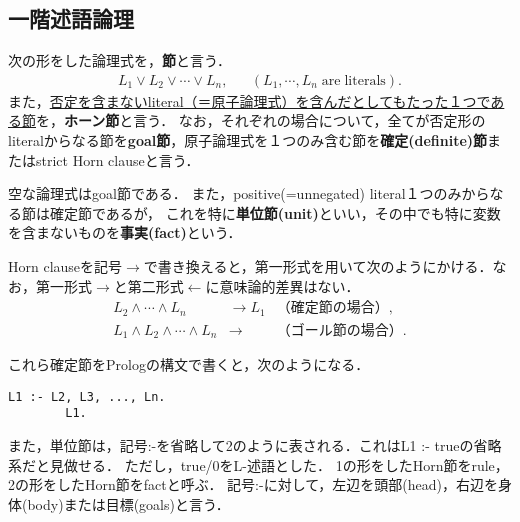\documentclass[uplatex, 12pt, dvipdfmx]{jsreport}
\begin{document}
\begin{example}
    
\end{example}

\subsection{一階述語論理}

\begin{definition}
    次の形をした論理式を，\textbf{節}と言う．
    \begin{align*}
        L_1\lor L_2\lor\cdots\lor L_n, && (L_1,\cdots,L_n\mathrm{\;are\;literals}).
    \end{align*}
    また，\underline{否定を含まないliteral（＝原子論理式）を含んだとしてもたった１つである節}を，\textbf{ホーン節}と言う．
    なお，それぞれの場合について，全てが否定形のliteralからなる節を\textbf{goal節}，原子論理式を１つのみ含む節を\textbf{確定(definite)節}またはstrict Horn clauseと言う．
\end{definition}
\begin{example}
    空な論理式はgoal節である．
    また，positive(=unnegated) literal１つのみからなる節は確定節であるが，
    これを特に\textbf{単位節(unit)}といい，その中でも特に変数を含まないものを\textbf{事実(fact)}という．
\end{example}
\begin{remark}
    Horn clauseを記号$\to$で書き換えると，第一形式を用いて次のようにかける．なお，第一形式$\to$と第二形式$\leftarrow$に意味論的差異はない．
    \begin{align*}
        L_2\land\cdots\land L_n &\to L_1 &（確定節の場合）,\\
        L_1\land L_2\land\cdots\land L_n &\to &（ゴール節の場合）.
    \end{align*}
\end{remark}
\begin{remark}[Prologでは]
    これら確定節をPrologの構文で書くと，次のようになる．
    \begin{lstlisting}[caption=Prolog]
        L1 :- L2, L3, ..., Ln.
        L1.
    \end{lstlisting}
    また，単位節は，記号:-を省略して2のように表される．これはL1 :- trueの省略系だと見做せる．
    ただし，true/0をL-述語とした．
    1の形をしたHorn節をrule，2の形をしたHorn節をfactと呼ぶ．
    記号:-に対して，左辺を頭部(head)，右辺を身体(body)または目標(goals)と言う．
\end{remark}
\end{document}
